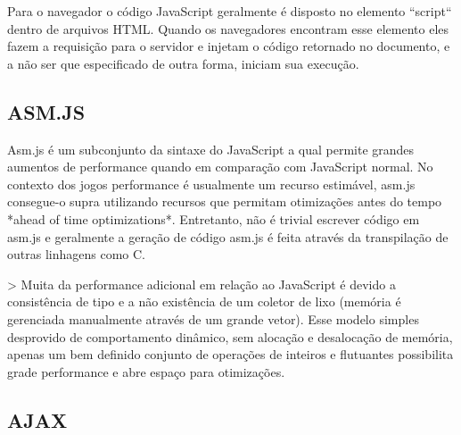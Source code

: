 \documentclass[11pt,a4paper]{article}
\begin{document}
Para o navegador o código JavaScript geralmente é disposto no elemento
``script`` dentro de arquivos HTML. Quando os navegadores encontram esse
elemento eles fazem a requisição para o servidor e injetam o código
retornado no documento, e a não ser que especificado de outra forma,
iniciam sua execução.

\subsection{ ASM.JS}

Asm.js é um subconjunto da sintaxe do JavaScript a qual permite grandes
aumentos de performance quando em comparação com JavaScript normal.
No contexto dos jogos performance é usualmente um recurso estimável,
asm.js consegue-o supra utilizando recursos que permitam otimizações
antes do tempo *ahead of time optimizations*. Entretanto, não é
trivial escrever código em asm.js e geralmente a geração de código
asm.js é feita através da transpilação de outras linhagens como C.

> Muita da performance adicional em relação ao JavaScript é devido
a consistência de tipo e a não existência de um coletor de lixo
(memória é gerenciada manualmente através de um grande vetor). Esse
modelo simples desprovido de comportamento dinâmico, sem alocação
e desalocação de memória, apenas um bem definido conjunto de
operações de inteiros e flutuantes possibilita grade performance e
abre espaço para otimizações.

\subsection{AJAX}
\end{document}
